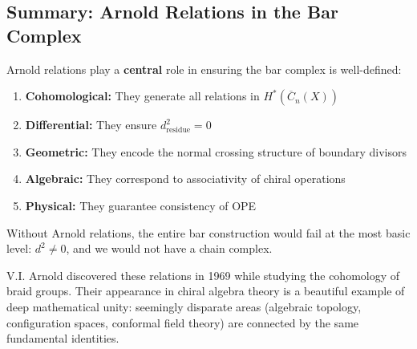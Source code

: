 \subsection{Summary: Arnold Relations in the Bar Complex}

\begin{summary}
Arnold relations play a \textbf{central} role in ensuring the bar complex is well-defined:

\begin{enumerate}
\item \textbf{Cohomological:} They generate all relations in $H^*(\overline{C}_n(X))$

\item \textbf{Differential:} They ensure $d_{\text{residue}}^2 = 0$

\item \textbf{Geometric:} They encode the normal crossing structure of boundary divisors

\item \textbf{Algebraic:} They correspond to associativity of chiral operations

\item \textbf{Physical:} They guarantee consistency of OPE
\end{enumerate}

Without Arnold relations, the entire bar construction would fail at the most basic level:
$d^2 \neq 0$, and we would not have a chain complex.
\end{summary}

\begin{remark}
V.I. Arnold discovered these relations in 1969 while studying the cohomology of braid
groups. Their appearance in chiral algebra theory is a beautiful example of deep
mathematical unity: seemingly disparate areas (algebraic topology, configuration spaces,
conformal field theory) are connected by the same fundamental identities.
\end{remark}

